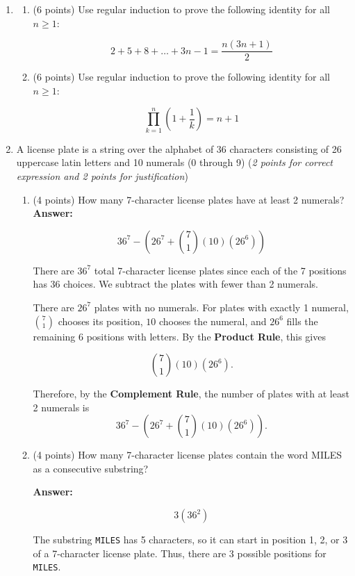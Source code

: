 \documentclass[10pt,letterpaper,unboxed,cm]{article}
\begin{document}
\begin{enumerate}

\item
\begin{enumerate}
\item (6 points)
Use regular induction to prove the following identity for all $n\geq 1$:

$$2+5+8+\dots + 3n-1 = \frac{n(3n+1)}{2}$$

\item (6 points)
Use regular induction to prove the following identity for all $n\geq 1$:

$$\prod_{k=1}^n (1 + \frac{1}{k}) = n+1$$
\end{enumerate}


\item
A license plate is a string over the alphabet of 36 characters consisting of 26 uppercase latin letters and 10 numerals (0 through 9) (\emph{2 points for correct expression and 2 points for justification})

\begin{enumerate}


\item
(4 points)
How many 7-character license plates have at least 2 numerals? \\

\textbf{Answer:}

\[
36^7-\left(26^7+\binom{7}{1}(10)(26^6)\right)
\]

There are $36^7$ total 7-character license plates since each of the
7 positions has 36 choices. We subtract the plates with fewer than
2 numerals.

There are $26^7$ plates with no numerals. For plates with exactly
1 numeral, $\binom{7}{1}$ chooses its position, $10$ chooses the
numeral, and $26^6$ fills the remaining 6 positions with letters.
By the \textbf{Product Rule}, this gives

\[
\binom{7}{1}(10)(26^6).
\]

Therefore, by the \textbf{Complement Rule}, the number of plates with
at least 2 numerals is
\[
\boxed{36^7-\left(26^7+\binom{7}{1}(10)(26^6)\right)}.
\]

\item
(4 points)
How many 7-character license plates contain the word MILES as a consecutive substring?

\textbf{Answer:}

\[
3(36^2)
\]

The substring \texttt{MILES} has 5 characters, so it can start in
position 1, 2, or 3 of a 7-character license plate. Thus, there are
3 possible positions for \texttt{MILES}.


\end{enumerate}
\end{enumerate}
\end{document}
